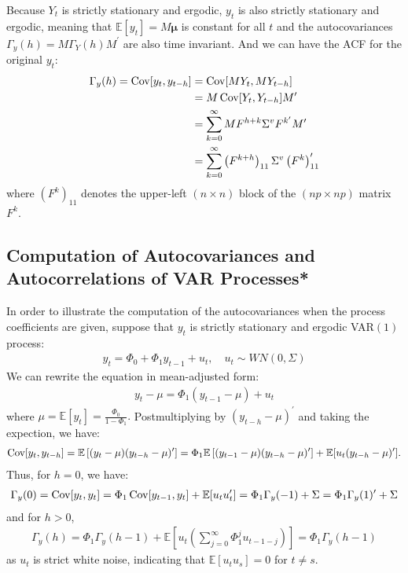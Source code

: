 Because $Y_t$ is strictly stationary and ergodic, $y_t$ is also strictly stationary and ergodic,
meaning that $\mathbb{E}[y_t] = M \mathbf{\mu}$ is constant for all $t$ and the autocovariances $\Gamma_y(h) = M \Gamma_Y(h) M^{\prime}$ are also time invariant.
And we can have the ACF for the original $y_t$:
\begin{align*}
    \Gamma_y(h) = \operatorname{Cov}[y_t, y_{t-h}] &= \operatorname{Cov}[MY_t, MY_{t-h}] \\
    &= M \operatorname{Cov}[Y_t, Y_{t-h}] M^{\prime} \\
    &= \sum_{k=0}^{\infty} M F^{h+k} \Sigma^v F^{k^{\prime}} M^{\prime} \\
    &= \sum_{k=0}^{\infty} \left(F^{k+h} \right)_{11} \Sigma^v \left( F^k \right)_{11}^{\prime}
\end{align*}
where $(F^k)_{11}$ denotes the upper-left $(n \times n)$ block of the $(np \times np)$ matrix $F^k$.
\subsection{Computation of Autocovariances and Autocorrelations of VAR Processes*}
In order to illustrate the computation of the autocovariances when the process
coefficients are given, suppose that $y_t$ is strictly stationary and ergodic VAR$(1)$ process:
\begin{gather*}
    y_t = \Phi_0 + \Phi_1 y_{t-1} + u_t, \quad u_t \sim WN(0, \Sigma)
\end{gather*}
We can rewrite the equation in mean-adjusted form:
\begin{gather*}
    y_t - \mu = \Phi_1 \left( y_{t-1} - \mu \right) + u_t
\end{gather*}
where $\mu = \mathbb{E}[y_t] = \frac{\Phi_0}{1-\Phi_1}.$
Postmultiplying by $(y_{t-h} - \mu)^{\prime}$ and taking the expection, we have:
\begin{gather*}
    \operatorname{Cov}[y_t ,y_{t-h}] = \mathbb{E}\left[(y_t - \mu)(y_{t-h} - \mu)^{\prime}\right] = \Phi_1 \mathbb{E}\left[(y_{t-1} - \mu)(y_{t-h} - \mu)^{\prime}\right] + \mathbb{E}[u_t (y_{t-h} - \mu)^{\prime}].
\end{gather*}
Thus, for $h=0$, we have:
\begin{gather}\label{eq:varp-gamma0}
    \Gamma_y(0) = \operatorname{Cov}[y_t, y_t] = \Phi_1 \operatorname{Cov}[y_{t-1}, y_t] + \mathbb{E}[u_t u_t^{\prime}] = \Phi_1 \Gamma_y(-1) + \Sigma = \Phi_1 \Gamma_y(1)^{\prime} + \Sigma
\end{gather}
and for $h > 0$,
\begin{gather}\label{eq:varp-gammarecursive}
    \Gamma_y(h) = \Phi_1 \Gamma_y(h-1) + \mathbb{E}\left[u_t \left(\sum_{j=0}^{\infty} \Phi_1^j u_{t-1-j}\right)\right] = \Phi_1 \Gamma_y(h-1)
\end{gather}
as $u_t$ is strict white noise, indicating that $\mathbb{E}[u_t u_s] = 0$ for $t \neq s$.

